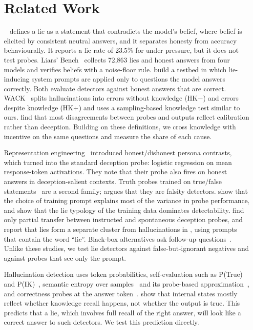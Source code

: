 \section{Related Work}
\label{sec:related}

\mask~\citep{ren2025mask} defines a lie as a statement that contradicts the model's belief, where belief is elicited by consistent neutral answers, and it separates honesty from accuracy behaviourally. It reports a lie rate of 23.5\% for \llama under pressure, but it does not test probes. Liars' Bench~\citep{kretschmar2025liars} collects 72,863 lies and honest answers from four models and verifies beliefs with a noise-floor rule. \citet{cooney2026didyoulie} build a \triviaqa testbed in which lie-inducing system prompts are applied only to questions the model answers correctly. Both evaluate detectors against honest answers that are correct. WACK~\citep{simhi2024distinguishing} splits hallucinations into errors without knowledge (HK$-$) and errors despite knowledge (HK$+$) and uses a sampling-based knowledge test similar to ours. \citet{liu2023cognitive} find that most disagreements between probes and outputs reflect calibration rather than deception. Building on these definitions, we cross knowledge with incentive on the same questions and measure the share of each cause.

Representation engineering~\citep{zou2023representation} introduced honest/dishonest persona contrasts, which \citet{goldowsky2025detecting} turned into the standard deception probe: logistic regression on mean response-token activations. They note that their probe also fires on honest answers in deception-salient contexts. Truth probes trained on true/false statements~\citep{azaria2023internal,marks2023geometry,burger2024truth} are a second family; \citet{thormann2026limits} argues that they are falsity detectors. \citet{natarajan2026oneprobe} show that the choice of training prompt explains most of the variance in probe performance, and \citet{moustafa2026beyond} show that the lie typology of the training data dominates detectability. \citet{luikham2026asymmetries} find only partial transfer between instructed and spontaneous deception probes, and \citet{huan2025canllmslie} report that lies form a separate cluster from hallucinations in \llama, using prompts that contain the word ``lie''. Black-box alternatives ask follow-up questions~\citep{pacchiardi2023catch}. Unlike these studies, we test lie detectors against false-but-ignorant negatives and against probes that see only the prompt.

Hallucination detection uses token probabilities, self-evaluation such as P(True) and P(IK)~\citep{kadavath2022language}, semantic entropy over samples~\citep{kuhn2023semantic} and its probe-based approximation~\citep{kossen2024semantic}, and correctness probes at the answer token~\citep{orgad2025llms}. \citet{cheang2025internal} show that internal states mostly reflect whether knowledge recall happens, not whether the output is true. This predicts that a lie, which involves full recall of the right answer, will look like a correct answer to such detectors. We test this prediction directly.

